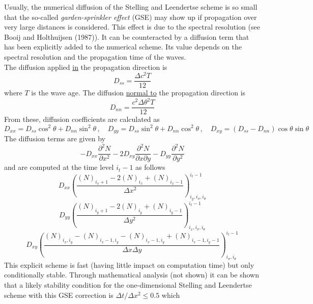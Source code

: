 \documentclass[12pt]{book}
\begin{document}
\noindent
Usually, the numerical diffusion of the Stelling and Leendertse scheme is so small that the so-called {\it garden-sprinkler effect} (GSE) may show up if propagation
over very large distances is considered. This effect is due to the spectral resolution (see Booij and Holthuijsen (1987)). It can be counteracted by a diffusion term
that has been explicitly added to the numerical scheme. Its value depends on the spectral resolution and the propagation time of the waves.
\\[2ex]
\noindent
The diffusion applied \underline{in} the propagation direction is
\begin{equation}
  D_{ss} = \frac{\Delta c^2T}{12}
\end{equation}
where $T$ is the wave age. The diffusion \underline{normal to} the propagation direction is
\begin{equation}
  D_{nn} = \frac{c^2 \Delta \theta^2 T}{12}
\end{equation}
From these, diffusion coefficients are calculated as
\begin{equation}
  D_{xx} = D_{ss} \cos^2\theta + D_{nn} \sin^2 \theta \,, \quad D_{yy} = D_{ss} \sin^2\theta + D_{nn} \cos^2 \theta \,, \quad
  D_{xy} = (D_{ss}-D_{nn}) \cos \theta \sin \theta
\end{equation}
The diffusion terms are given by
\begin{equation}
  -D_{xx}\frac{\partial^2 N}{\partial x^2}
  -2D_{xy}\frac{\partial^2 N}{\partial x \partial y}
  -D_{yy}\frac{\partial^2 N}{\partial y^2}
  \label{eq:gsediff}
\end{equation}
and are computed at the time level $i_t-1$ as follows
\begin{equation}
  D_{xx} \left( \frac{(N)_{i_x+1} - 2(N)_{i_x} + (N)_{i_x-1}}{\Delta x^2} \right)^{i_t-1}_{i_y, i_{\sigma}, i_{\theta}}
\end{equation}
\begin{equation}
  D_{yy} \left( \frac{(N)_{i_y+1} - 2(N)_{i_y} + (N)_{i_y-1}}{\Delta y^2} \right)^{i_t-1}_{i_x, i_{\sigma}, i_{\theta}}
\end{equation}
\begin{equation}
  D_{xy} \left( \frac{(N)_{i_x,i_y} - (N)_{i_x-1,i_y} - (N)_{i_x-1,i_y} + (N)_{i_x-1,i_y-1}}{\Delta x \Delta y} \right)^{i_t-1}_{i_{\sigma}, i_{\theta}}
\end{equation}
This explicit scheme is fast (having little impact on computation time) but only conditionally stable. Through mathematical analysis (not shown) it can be
shown that a likely stability condition for the one-dimensional Stelling and Leendertse scheme with this GSE correction is $\Delta t/\Delta x^2 \leq 0.5$ which
\end{document}
